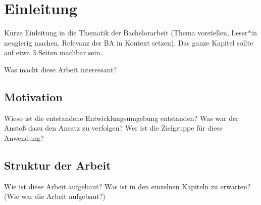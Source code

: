 \chapter{Einleitung} %
Kurze Einleitung in die Thematik der Bachelorarbeit (Thema vorstellen, Leser*in neugierig machen, Relevanz der BA in Kontext setzen).
Das ganze Kapitel sollte auf etwa 3 Seiten machbar sein.

Was macht diese Arbeit interessant?

\section{Motivation} %
Wieso ist die entstandene Entwicklungsumgebung entstanden? Was war der Anstoß dazu den Ansatz zu verfolgen? Wer ist die Zielgruppe für diese Anwendung? 

\section{Struktur der Arbeit} %
Wie ist diese Arbeit aufgebaut? Was ist in den einzelnen Kapiteln zu erwarten? (Wie war die Arbeit aufgebaut?)